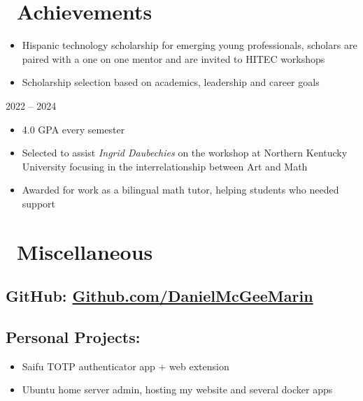 \documentclass{resume}
\begin{document}
\section{\faCertificate\ Achievements}
\begin{itemize}
    \item Hispanic technology scholarship for emerging young professionals, scholars are paired with a one on one mentor and are invited to HITEC workshops
\end{itemize}
\vspace{0.2em}
\begin{itemize}
    \item Scholarship selection based on academics, leadership and career goals
\end{itemize}
\vspace{0.2em}
 {2022 -- 2024}
\begin{itemize}
    \item 4.0 GPA every semester
\end{itemize}
\vspace{0.2em}
\begin{itemize}
    \item Selected to assist \textit{Ingrid Daubechies} on the workshop at Northern Kentucky University focusing in the interrelationship between Art and Math
\end{itemize}
\vspace{0.2em}
\begin{itemize}
    \item Awarded for work as a bilingual math tutor, helping students who needed support
\end{itemize}

\section{\faInfo\ Miscellaneous}
\subsection{GitHub: \href{https://github.com/DanielMcGeeMarin}{Github.com/DanielMcGeeMarin}}
\subsection{Personal Projects:}
\begin{itemize}[parsep=0.5ex]
  \item Saifu TOTP authenticator app + web extension
  \item Ubuntu home server admin, hosting my website and several docker apps
\end{itemize}
\end{document}

